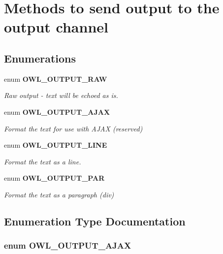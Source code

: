 \section{Methods to send output to the output channel}
\label{group__OutputMethods}
\subsection*{Enumerations}
\begin{DoxyCompactItemize}
\item 
enum {\bf OWL\_\-OUTPUT\_\-RAW} 
\begin{DoxyCompactList}\small\item\em Raw output -\/ text will be echoed as is. \end{DoxyCompactList}\item 
enum {\bf OWL\_\-OUTPUT\_\-AJAX} 
\begin{DoxyCompactList}\small\item\em Format the text for use with AJAX (reserved) \end{DoxyCompactList}\item 
enum {\bf OWL\_\-OUTPUT\_\-LINE} 
\begin{DoxyCompactList}\small\item\em Format the text as a line. \end{DoxyCompactList}\item 
enum {\bf OWL\_\-OUTPUT\_\-PAR} 
\begin{DoxyCompactList}\small\item\em Format the text as a paragraph (div) \end{DoxyCompactList}\end{DoxyCompactItemize}


\subsection{Enumeration Type Documentation}
\subsubsection[{OWL\_\-OUTPUT\_\-AJAX}]{\setlength{\rightskip}{0pt plus 5cm}enum {\bf OWL\_\-OUTPUT\_\-AJAX}}\label{group__OutputMethods_gaf963854f30d42f9f1084aa5e69f0ecf3}



